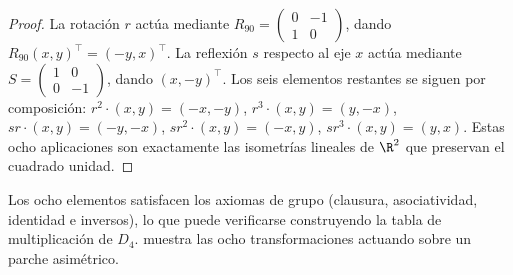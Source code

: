 \begin{proof}
La rotaci\'on $r$ act\'ua mediante $R_{90} = \left(\begin{smallmatrix} 0 & -1 \\
1 & 0 \end{smallmatrix}\right)$, dando $R_{90}(x,y)^\top = (-y,x)^\top$. La
reflexi\'on $s$ respecto al eje $x$ act\'ua mediante $S =
\left(\begin{smallmatrix} 1 & 0 \\ 0 & -1 \end{smallmatrix}\right)$, dando
$(x,-y)^\top$. Los seis elementos restantes se siguen por composici\'on: $r^2
\cdot (x,y) = (-x,-y)$, $r^3 \cdot (x,y) = (y,-x)$, $sr \cdot (x,y) = (-y,-x)$,
$sr^2 \cdot (x,y) = (-x,y)$, $sr^3 \cdot (x,y) = (y,x)$. Estas ocho aplicaciones
son exactamente las isometr\'ias lineales de $\R^2$ que preservan el cuadrado
unidad.
\end{proof}

Los ocho elementos satisfacen los axiomas de grupo (clausura, asociatividad,
identidad e inversos), lo que puede verificarse construyendo la tabla de
multiplicaci\'on de $D_4$.  muestra las ocho
transformaciones actuando sobre un parche asim\'etrico.


